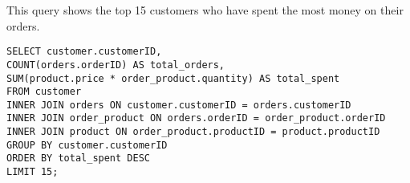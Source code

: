 This query shows the top 15 customers who have spent the most money on their orders.

\begin{lstlisting}
SELECT customer.customerID,
COUNT(orders.orderID) AS total_orders,
SUM(product.price * order_product.quantity) AS total_spent
FROM customer
INNER JOIN orders ON customer.customerID = orders.customerID
INNER JOIN order_product ON orders.orderID = order_product.orderID
INNER JOIN product ON order_product.productID = product.productID
GROUP BY customer.customerID
ORDER BY total_spent DESC
LIMIT 15;
\end{lstlisting}